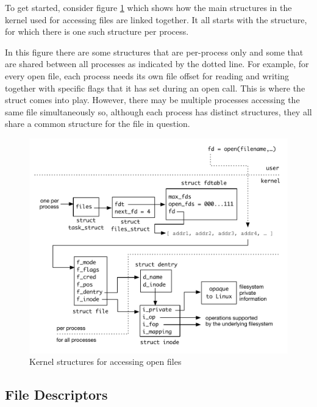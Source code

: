 To get started, consider figure \ref{fig:per-file-kernel-structures} which shows how the main structures in the kernel used for accessing files are linked together. It all starts with the  structure, for which there is one such structure per process. 

In this figure there are some structures that are per-process only and some that are shared between all processes as indicated by the dotted line. For example, for every open file, each process needs its own file offset for reading and writing together with specific flags that it has set during an open call. This is where the  struct comes into play. However, there may be multiple processes accessing the same file simultaneously so, although each process has distinct  structures, they all share a common  structure for the file in question.

\begin{figure}[h]
	\centering
	\includegraphics[scale=0.6]{figures/per-file-kernel-structures.pdf}
	\caption{Kernel structures for accessing open files}
	\label{fig:per-file-kernel-structures}
\end{figure}


\subsection{File Descriptors}

